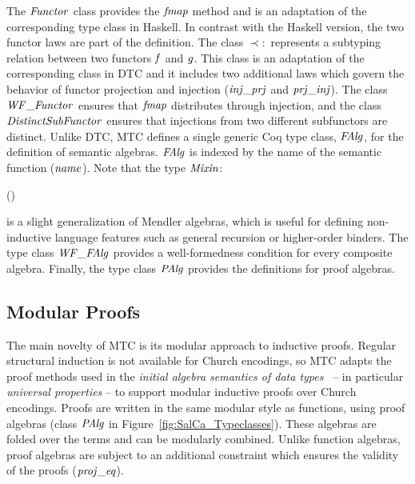 The \ensuremath{\Conid{Functor}} class provides the \ensuremath{\Varid{fmap}} method and is an adaptation of
the corresponding type class in Haskell. In contrast with the Haskell
version, the two functor laws are part of the definition. The class \ensuremath{\prec:} represents a subtyping relation between two functors \ensuremath{\Varid{f}} and
\ensuremath{\Varid{g}}. This class is an adaptation of the corresponding class in DTC and
it includes two additional laws which govern the behavior of functor
projection and injection (\ensuremath{\Varid{inj\char95 prj}} and \ensuremath{\Varid{prj\char95 inj}}). The class
\ensuremath{\Conid{WF\char95 Functor}} ensures that \ensuremath{\Varid{fmap}} distributes through injection, and
the class \ensuremath{\Conid{DistinctSubFunctor}} ensures that injections from two
different subfunctors are distinct. Unlike DTC, MTC defines a single
generic Coq type class, \ensuremath{\Conid{FAlg}}, for the definition of semantic
algebras.  \ensuremath{\Conid{FAlg}} is indexed by the name of the semantic
function (\ensuremath{\Varid{name}}). Note that the type \ensuremath{\Conid{Mixin}}:
\begin{hscode}\SaveRestoreHook
{}%
%
%
\>[3]{}\;\;\;\;\mathrel{=}(\to {})\to {}\;\to {}\<[E]%
\ColumnHook
\end{hscode}\resethooks
\noindent is a slight generalization of Mendler algebras, which is
useful for defining non-inductive language features such as general
recursion or higher-order binders. The type class \ensuremath{\Conid{WF\char95 FAlg}} provides a
well-formedness condition for every composite algebra. Finally,
the type class \ensuremath{\Conid{PAlg}} provides the definitions for proof algebras.



\vspace{-.08cm}
\subsection{Modular Proofs}\label{subsec:modproofs}
\vspace{-.07cm}
The main novelty of MTC is its modular approach to inductive
proofs. Regular structural induction is not available for Church
encodings, so MTC adapts the proof methods used in the \emph{initial
algebra semantics of data
types}~\cite{goguen77initial,malcolm90thesis} -- in particular
\emph{universal properties} -- to support modular inductive proofs
over Church encodings. Proofs are written in the same modular style as
functions, using proof algebras (class \ensuremath{\Conid{PAlg}} in
Figure~\ref{fig:SalCa_Typeclasses}).  These algebras are folded over
the terms and can be modularly combined.  Unlike function algebras,
proof algebras are subject to an additional constraint which ensures
the validity of the proofs (\ensuremath{\Varid{proj\char95 eq}}).


